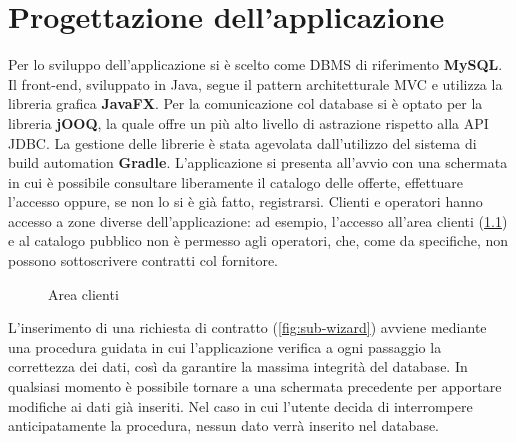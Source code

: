 \documentclass[a4paper,12pt]{report}
\begin{document}
\chapter{Progettazione dell'applicazione}
Per lo sviluppo dell'applicazione si è scelto come DBMS di riferimento \textbf{MySQL}. Il front-end, sviluppato in Java, segue il pattern architetturale MVC e utilizza la libreria grafica \textbf{JavaFX}. Per la comunicazione col database si è optato per la libreria \textbf{jOOQ}, la quale offre un più alto livello di astrazione rispetto alla API JDBC. La gestione delle librerie è stata agevolata dall'utilizzo del sistema di build automation \textbf{Gradle}.
\newline
L'applicazione si presenta all'avvio con una schermata in cui è possibile consultare liberamente il catalogo delle offerte, effettuare l'accesso oppure, se non lo si è già fatto, registrarsi. Clienti e operatori hanno accesso a zone diverse dell'applicazione: ad esempio, l'accesso all'area clienti (\cref{fig:user-area}) e al catalogo pubblico non è permesso agli operatori, che, come da specifiche, non possono sottoscrivere contratti col fornitore.

\begin{figure}[H]
    \centering{}
    \caption{Area clienti}
    \label{fig:user-area}
\end{figure}

L'inserimento di una richiesta di contratto (\cref{fig:sub-wizard}) avviene mediante una procedura guidata in cui l'applicazione verifica a ogni passaggio la correttezza dei dati, così da garantire la massima integrità del database. In qualsiasi momento è possibile tornare a una schermata precedente per apportare modifiche ai dati già inseriti. Nel caso in cui l'utente decida di interrompere anticipatamente la procedura, nessun dato verrà inserito nel database.
\end{document}
